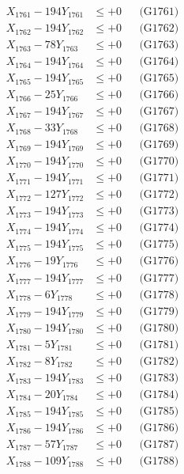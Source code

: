 \documentclass[a4paper,10pt]{article}
\begin{document}
{\begin{align}
\allowbreak
X_{1761} - 194Y_{1761} &\leq +0 && \text{(G1761)} \\
X_{1762} - 194Y_{1762} &\leq +0 && \text{(G1762)} \\
X_{1763} - 78Y_{1763} &\leq +0 && \text{(G1763)} \\
X_{1764} - 194Y_{1764} &\leq +0 && \text{(G1764)} \\
X_{1765} - 194Y_{1765} &\leq +0 && \text{(G1765)} \\
X_{1766} - 25Y_{1766} &\leq +0 && \text{(G1766)} \\
X_{1767} - 194Y_{1767} &\leq +0 && \text{(G1767)} \\
X_{1768} - 33Y_{1768} &\leq +0 && \text{(G1768)} \\
X_{1769} - 194Y_{1769} &\leq +0 && \text{(G1769)} \\
X_{1770} - 194Y_{1770} &\leq +0 && \text{(G1770)} \\
\allowbreak
X_{1771} - 194Y_{1771} &\leq +0 && \text{(G1771)} \\
X_{1772} - 127Y_{1772} &\leq +0 && \text{(G1772)} \\
X_{1773} - 194Y_{1773} &\leq +0 && \text{(G1773)} \\
X_{1774} - 194Y_{1774} &\leq +0 && \text{(G1774)} \\
X_{1775} - 194Y_{1775} &\leq +0 && \text{(G1775)} \\
X_{1776} - 19Y_{1776} &\leq +0 && \text{(G1776)} \\
X_{1777} - 194Y_{1777} &\leq +0 && \text{(G1777)} \\
X_{1778} - 6Y_{1778} &\leq +0 && \text{(G1778)} \\
X_{1779} - 194Y_{1779} &\leq +0 && \text{(G1779)} \\
X_{1780} - 194Y_{1780} &\leq +0 && \text{(G1780)} \\
\allowbreak
X_{1781} - 5Y_{1781} &\leq +0 && \text{(G1781)} \\
X_{1782} - 8Y_{1782} &\leq +0 && \text{(G1782)} \\
X_{1783} - 194Y_{1783} &\leq +0 && \text{(G1783)} \\
X_{1784} - 20Y_{1784} &\leq +0 && \text{(G1784)} \\
X_{1785} - 194Y_{1785} &\leq +0 && \text{(G1785)} \\
X_{1786} - 194Y_{1786} &\leq +0 && \text{(G1786)} \\
X_{1787} - 57Y_{1787} &\leq +0 && \text{(G1787)} \\
X_{1788} - 109Y_{1788} &\leq +0 && \text{(G1788)} \\

\end{align}}
\end{document}
